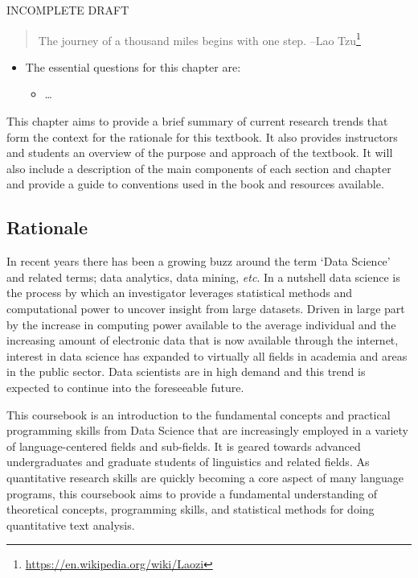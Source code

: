 \documentclass[
]{article}
\DeclareRobustCommand{\href}[2]{#2\footnote{\url{#1}}}
\providecommand{\tightlist}{%
  \setlength{\itemsep}{0pt}\setlength{\parskip}{0pt}}
\newenvironment{rmdblock}[1]
  {\begin{shaded*}
  \begin{itemize}
  \renewcommand{\labelitemi}{
    \raisebox{-.5\height}[0pt][0pt]{
      {\setkeys{Gin}{width=2em,keepaspectratio}\texttt{[image: assets/images/\#1]}}
    }
  }
  \item
  }
  {
  \end{itemize}
  \end{shaded*}
  }
\newenvironment{rmdkey}
  {\begin{rmdblock}{key}}
  {\end{rmdblock}}
\begin{document}
INCOMPLETE DRAFT

\begin{quote}
The journey of a thousand miles begins with one step.
--\href{https://en.wikipedia.org/wiki/Laozi}{Lao Tzu}
\end{quote}

\begin{rmdkey}
The essential questions for this chapter are:

\begin{itemize}
\tightlist
\item
  \ldots{}
\end{itemize}
\end{rmdkey}

This chapter aims to provide a brief summary of current research trends that form the context for the rationale for this textbook. It also provides instructors and students an overview of the purpose and approach of the textbook. It will also include a description of the main components of each section and chapter and provide a guide to conventions used in the book and resources available.

\hypertarget{rationale}{%
\subsection{Rationale}\label{rationale}}

In recent years there has been a growing buzz around the term `Data Science' and related terms; data analytics, data mining, \emph{etc}. In a nutshell data science is the process by which an investigator leverages statistical methods and computational power to uncover insight from large datasets. Driven in large part by the increase in computing power available to the average individual and the increasing amount of electronic data that is now available through the internet, interest in data science has expanded to virtually all fields in academia and areas in the public sector. Data scientists are in high demand and this trend is expected to continue into the foreseeable future.

This coursebook is an introduction to the fundamental concepts and practical programming skills from Data Science that are increasingly employed in a variety of language-centered fields and sub-fields. It is geared towards advanced undergraduates and graduate students of linguistics and related fields. As quantitative research skills are quickly becoming a core aspect of many language programs, this coursebook aims to provide a fundamental understanding of theoretical concepts, programming skills, and statistical methods for doing quantitative text analysis.
\end{document}
